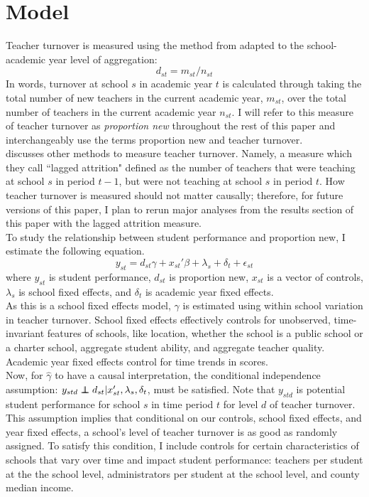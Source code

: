 \documentclass[12pt]{report}
\newcommand\independent{\protect\mathpalette{\protect\independenT}{\perp}}
\def\independenT#1#2{\mathrel{\rlap{$#1#2$}\mkern2mu{#1#2}}}
\begin{document}
\section{Model}
\noindent Teacher turnover is measured using the method from \cite{ronfeldt} adapted to the school-academic year level of aggregation:
\begin{equation}
d_{st} = m_{st} / n_{st}
\end{equation}
\noindent In words, turnover at school $s$ in academic year $t$ is calculated through taking the total number of new teachers in the current academic year, $m_{st}$, over the total number of teachers in the current academic year $n_{st}$. I will refer to this measure of teacher turnover as \textit{proportion new} throughout the rest of this paper and interchangeably use the terms proportion new and teacher turnover. \\
\indent \cite{ronfeldt} discusses other methods to measure teacher turnover. Namely, a measure which they call ``lagged attrition" defined as the number of teachers that were teaching at school $s$ in period $t-1$, but were not teaching at school $s$ in period $t$. How teacher turnover is measured should not matter causally; therefore, for future versions of this paper, I plan to rerun major analyses from the results section of this paper with the lagged attrition measure.  \\
\indent To study the relationship between student performance and proportion new, I estimate the following equation.
\begin{equation}
y_{st} = d_{st}\gamma + x_{st}'\beta + \lambda_s + \delta_t + \epsilon_{st}
\end{equation}
where $y_{st}$ is student performance, $d_{st}$ is proportion new, $x_{st}$ is a vector of controls, $\lambda_s$ is school fixed effects, and $\delta_t$ is academic year fixed effects.  \\
\indent As this is a school fixed effects model, $\gamma$ is estimated using within school variation in teacher turnover. School fixed effects effectively controls for unobserved, time-invariant features of schools, like location, whether the school is a public school or a charter school, aggregate student ability, and aggregate teacher quality. Academic year fixed effects control for time trends in scores. \\ 
\indent Now, for $\hat{\gamma}$ to have a causal interpretation, the conditional independence assumption: $y_{std}\independent d_{st}|x'_{st},\lambda_s,\delta_t$, must be satisfied. Note that $y_{std}$ is potential student performance for school $s$ in time period $t$ for level $d$ of teacher turnover. This assumption implies that conditional on our controls, school fixed effects, and year fixed effects, a school's level of teacher turnover is as good as randomly assigned. To satisfy this condition, I include controls for certain characteristics of schools that vary over time and impact student performance: teachers per student at the the school level, administrators per student at the school level, and county median income. \\
\end{document}
